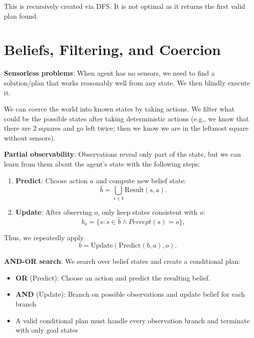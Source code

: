 \documentclass{report}
\begin{document}
This is recursively created via DFS. It is not optimal as it returns the first valid plan found.


\section{Beliefs, Filtering, and Coercion}

\textbf{Sensorless problems}: When agent has no sensors, we need to find a solution/plan that works reasonably well from any state. We then blindly execute it.


We can coerce the world into known states by taking actions. We filter what could be the possible states after taking deterministic actions (e.g., we know that there are 2 squares and go left twice; then we know we are in the leftmost square without sensors). 

\textbf{Partial observability}: Observations reveal only part of the state, but we can learn from them about the agent's state with the following steps:

\begin{enumerate}
    \item \textbf{Predict}: Choose action $a$ and compute new belief state: 
    \[ \widehat b = \bigcup_{s\in b}\mathrm{Result(s,a)}. \]
    \item \textbf{Update}: After observing $o$, only keep states consistent with $o$:
    \[b_o=\{s: s\in\widehat b \land Percept(s)=o\},\]
\end{enumerate}

Thus, we repeatedly apply
\[
b=\mathrm{Update}(\mathrm{Predict}(b,a),o).
\]

\textbf{AND-OR search}: We search over belief states and create a conditional plan:
\begin{itemize}
    \item \textbf{OR} (Predict): Choose an action and predict the resulting belief.
    \item \textbf{AND} (Update): Branch on possible observations and update belief for each branch
    \item A valid conditional plan must handle every observation branch and terminate with only goal states
\end{itemize}
\end{document}
